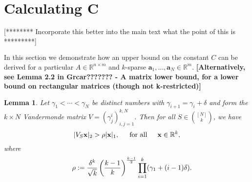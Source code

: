 \documentclass[journal, onecolumn]{IEEEtran}
\newtheorem{lemma}{Lemma}
\newtheorem{remark}{Remark}
\begin{document}



\section{Calculating C}

[********  Incorporate this better into the main text what the point of this is *********]

In this section we demonstrate how an upper bound on the constant $C$ can be derived for a particular $A \in \mathbb{R}^{n \times m}$ and $k$-sparse $\mathbf{a}_1, \ldots, \mathbf{a}_N \in \mathbb{R}^m$. \textbf{[Alternatively, see Lemma 2.2 in Grcar??????? - A matrix lower bound, for a lower bound on rectangular matrices (though not k-restricted)]}


\begin{lemma}\label{MatrixLowerBoundLemma}
Let $\gamma_1 < \cdots < \gamma_N$ be distinct numbers with $\gamma_{i+1} = \gamma_i + \delta$ and form the $k \times N$ Vandermonde matrix $V = (\gamma^i_j)^{k,N}_{i,j=1}$. Then for all $S \in {[N] \choose k}$, we have
\begin{align}
	|V_S \mathbf{x}|_2 > \rho |\mathbf{x}|_1, \indent \text{for all} \indent \mathbf{x} \in \mathbb{R}^k,
\end{align}
where \[\indent \rho := \frac{\delta^k}{\sqrt{k}} \left( \frac{k-1}{k} \right)^\frac{k-1}{2} \prod_{i = 1}^k (\gamma_1 + (i-1)\delta).\]
\end{lemma}
\end{document}
